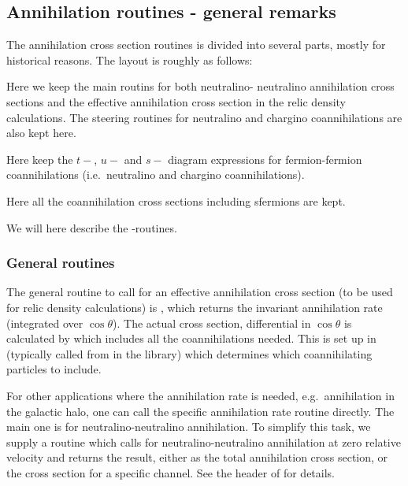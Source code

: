 
\subsection{Annihilation routines - general remarks}

The annihilation cross section routines is divided into several parts,
mostly for historical reasons. The layout is roughly as follows:
\begin{description}
  \item{} Here we keep the main routins for both neutralino-
  neutralino annihilation cross sections and the effective annihilation
  cross section in the relic density calculations. The steering routines
  for neutralino and chargino coannihilations are also kept here.
  
\item{} Here keep the $t-$, $u-$ and $s-$ diagram expressions
for fermion-fermion coannihilations (i.e.\ neutralino and chargino
coannihilations).

\item{} Here all the coannihilation cross sections including
sfermions are kept.

\end{description}

We will here describe the -routines.


\subsubsection{General routines}

The general routine to call for an effective annihilation cross section (to
be used for relic density calculations) is , which returns the
invariant annihilation rate (integrated over $\cos \theta$). The actual
cross section, differential in $\cos \theta$ is calculated by 
 which includes all the coannihilations needed. This is set
up in  (typically called from  in 
the  library) which determines which coannihilating particles
to include.

For other applications where the annihilation rate is needed, e.g.\ annihilation
in the galactic halo, one can call the specific annihilation rate routine
directly. The main one is  for neutralino-neutralino
annihilation. To simplify this task, we supply a routine  which
calls  for neutralino-neutralino annihilation at zero
relative velocity and returns the result, either as the total annihilation
cross section, or the cross section for a specific channel. See the header of
 for details.

